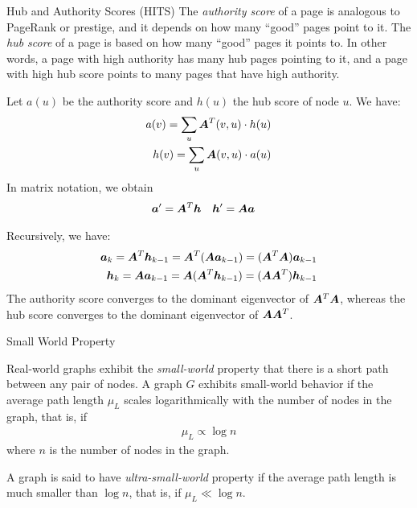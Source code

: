 \begin{frame}{Hub and Authority Scores (HITS)}
  \small
The
{\em authority score} of a page is analogous to PageRank or prestige,
and it depends on how many ``good'' pages point to it. 
The {\em hub score} of a page is based on how many ``good'' pages
it points to. 
In other words, a page with high authority has many hub
pages pointing to it, and a page with high hub score points to many
pages that have high authority.

\medskip
Let $a(u)$ be the authority score and $h(u)$ the hub score of
node $u$. We have:
\begin{align*}
  a(v) = \sum_u {\boldsymbol A}^T(v,u)\cdot h(u)\\
  h(v) = \sum_u {\boldsymbol A}(v,u)\cdot a(u)
\end{align*}
In matrix notation, we obtain
\begin{align*}
  {\boldsymbol a}' & = {\boldsymbol A}^T {\boldsymbol h} & 
  {\boldsymbol h}' & = {\boldsymbol A} {\boldsymbol a}
\end{align*}

\medskip
Recursively, we have:
\begin{align*}
  {\boldsymbol a}_k = {\boldsymbol A}^T {\boldsymbol h}_{k-1} = {\boldsymbol A}^T ({\boldsymbol A} {\boldsymbol a}_{k-1}) = ({\boldsymbol A}^T{\boldsymbol A}) {\boldsymbol a}_{k-1} \\
  {\boldsymbol h}_k = {\boldsymbol A} {\boldsymbol a}_{k-1} = {\boldsymbol A} ({\boldsymbol A}^T {\boldsymbol h}_{k-1}) = ({\boldsymbol A}{\boldsymbol A}^T) {\boldsymbol h}_{k-1}
\end{align*}
The authority score converges to the
dominant eigenvector of ${\boldsymbol A}^T{\boldsymbol A}$, whereas the hub score converges to
the dominant eigenvector of ${\boldsymbol A}{\boldsymbol A}^T$. 
\end{frame}

\ifdefined\wox \begin{frame} \titlepage \end{frame} \fi

\begin{frame}{Small World Property}

Real-world graphs exhibit the
 {\em small-world} property that there is a short path
between any pair of nodes.
A
graph $G$ exhibits small-world behavior if the average path
length $\mu_L$ scales logarithmically with the number of nodes in the
graph, that is, if
\begin{align*}
    \mu_L \propto \log n
\end{align*}
where $n$ is the number of nodes in the graph.

\medskip
A graph is said to have {\em ultra-small-world} property if the
average path length is much smaller than $\log n$, that is, if
$\mu_L \ll \log n$.
\end{frame}



